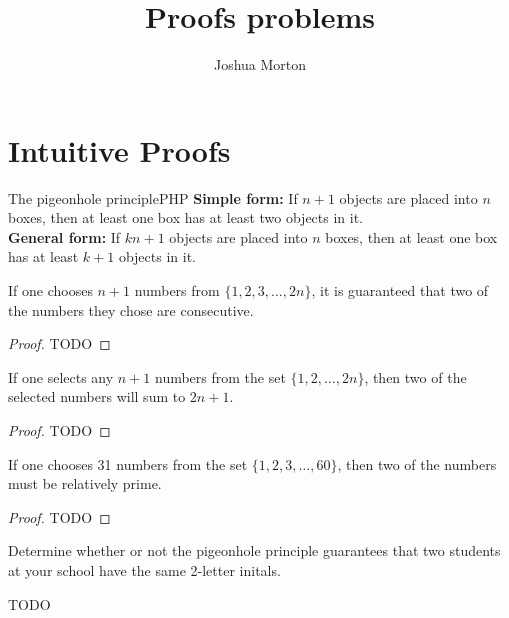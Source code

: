 \documentclass{report}
\begin{document}
\title{Proofs problems}
\author{Joshua Morton}
\maketitle

\chapter{Intuitive Proofs}

\begin{fact}{The pigeonhole principle}{PHP}
  \textbf{Simple form:} If $n + 1$ objects are placed into $n$ boxes, then at least one box has at least two objects in it. \\
  \textbf{General form:} If $kn + 1$ objects are placed into $n$ boxes, then at least one box has at least $k + 1$ objects in it.
\end{fact}

\begin{proposition*}{}
  If one chooses $n+1$ numbers from $\{1, 2, 3, \ldots, 2n\}$, it is guaranteed that two of the numbers they chose are consecutive.
\end{proposition*}

\begin{proof}
  TODO
\end{proof}

\begin{proposition*}{}
  If one selects any $n + 1$ numbers from the set $\{1, 2,\ldots,2n\}$, then two of the selected numbers will sum to $2n + 1.$
\end{proposition*}

\begin{proof}
  TODO
\end{proof}

\begin{proposition*}{}
  If one chooses 31 numbers from the set $\{1,2,3,\ldots,60\}$, then two of the numbers must be relatively prime.
\end{proposition*}

\begin{proof}
  TODO
\end{proof}

\begin{problem*}{}
  Determine whether or not the pigeonhole principle guarantees that two students at your school have the same 2-letter initals.
\end{problem*}

TODO
\end{document}
